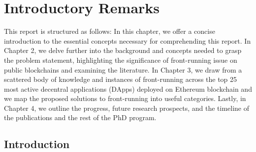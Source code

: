 






\chapter{Introductory Remarks} \label{sec:intro}




This report is structured as follows: In this chapter, we offer a concise introduction to the essential concepts necessary for comprehending this report. In Chapter 2, we delve further into the background and concepts needed to grasp the problem statement, highlighting the significance of front-running issue on public blockchains and examining the literature. In Chapter 3, we draw from a scattered body of knowledge and instances of front-running across the top 25 most active decentral applications (DApps) deployed on Ethereum blockchain and we map the proposed solutions to front-running into useful categories. Lastly, in Chapter 4, we outline the progress, future research prospects, and the timeline of the publications and the rest of the PhD program.




\section{Introduction} \label{sec:intro}


